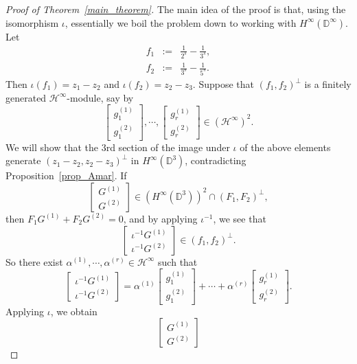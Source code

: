\documentclass[11pt,reqno]{amsart}
\numberwithin{equation}{section}
\theoremstyle{definition}
\theoremstyle{definition}
\theoremstyle{definition}
\begin{document}
\begin{proof}[Proof of Theorem~\ref{main_theorem}] 
The main idea of the proof is that, using the isomorphism $\iota$, 
essentially we boil the problem down to working with
$H^\infty({\mathbb{D}}^\infty)$.  Let
\begin{eqnarray*}
  f_1&:=&\frac{1}{2^s}-\frac{1}{3^s},\\
  f_2&:=& \frac{1}{3^s}-\frac{1}{5^s}.
\end{eqnarray*}
Then $\iota(f_1)=z_1-z_2$ and $\iota(f_2)=z_2-z_3$.  Suppose that
$(f_1,f_2)^\perp$ is a finitely generated ${{{\mathscr{H}}^{\infty}}}$-module, say by
$$
\left[ \begin{array}{cc} g_1^{(1)}\\g_1^{(2)}\end{array}\right], 
 \cdots ,
\left[ \begin{array}{cc} g_r^{(1)}\\g_r^{(2)}\end{array}\right]\in ({{{\mathscr{H}}^{\infty}}})^2.
$$
We will show that the $3$rd section of the image under $\iota$ of the
above elements generate $(z_1-z_2,z_2-z_3)^\perp$ in
$H^\infty({\mathbb{D}}^3)$, contradicting Proposition~\ref{prop_Amar}.  If
$$
\left[\begin{array}{cc} G^{(1)} \\ G^{(2)}\end{array}\right] 
\in (H^\infty({\mathbb{D}}^3))^2 \cap (F_1,F_2)^\perp,
$$
then $F_1 G^{(1)} +F_2G^{(2)}=0$, and by applying $\iota^{-1}$, we see
that
$$
 \left[\begin{array}{cc} \iota^{-1}G^{(1)} \\ \iota^{-1} G^{(2)}\end{array}\right] 
 \in  (f_1,f_2)^\perp.
$$
So there exist $\alpha^{(1)},\cdots,\alpha^{(r)} \in {{{\mathscr{H}}^{\infty}}}$ such that
$$
\left[\begin{array}{cc} \iota^{-1}G^{(1)} \\ \iota^{-1} G^{(2)}\end{array}\right] 
=
\alpha^{(1)} \left[ \begin{array}{cc} g_1^{(1)}\\g_1^{(2)}\end{array}\right]
+ \cdots +
\alpha^{(r)} \left[ \begin{array}{cc} g_r^{(1)}\\g_r^{(2)}\end{array}\right].
$$
Applying $\iota$, we obtain
$$
\left[\begin{array}{cc} G^{(1)} \\ G^{(2)}\end{array}\right] 
$$
\end{proof}
\end{document}
